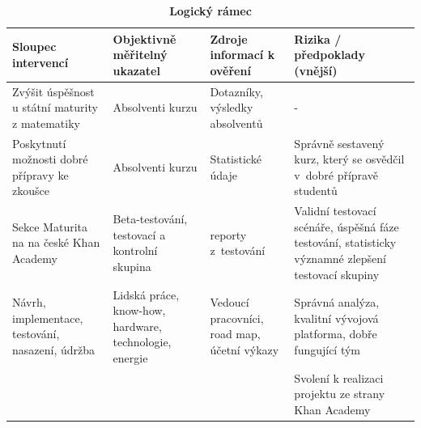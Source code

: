 \documentclass[12pt, a4paper]{report}
\begin{document}
\begin{table}[htbp]
\caption{\textbf{Logický rámec}}
\centering
\begin{tabularx}{\textwidth}{XXXX}
Sloupec intervencí & Objektivně měřitelný ukazatel & Zdroje informací k ověření & Rizika / předpoklady (vnější)\\
\hline
Zvýšit úspěšnost u státní maturity z matematiky & Absolventi kurzu & Dotazníky, výsledky absolventů & -\\
\hline
Poskytnutí možnosti dobré přípravy ke zkoušce & Absolventi kurzu & Statistické údaje & Správně sestavený kurz, který se osvědčil v dobré přípravě studentů\\
\hline
Sekce Maturita na na české Khan Academy & Beta-testování, testovací a  kontrolní skupina & reporty z testování & Validní testovací scénáře, úspěšná fáze testování, statisticky významné zlepšení testovací skupiny\\
\hline
Návrh, implementace, testování, nasazení, údržba & Lidská práce, know-how, hardware, technologie, energie & Vedoucí pracovníci, road map, účetní výkazy & Správná analýza, kvalitní vývojová platforma, dobře fungující tým\\
\hline
 &  &  & Svolení k realizaci projektu ze strany Khan Academy\\
\end{tabularx}
\end{table}
\end{document}
